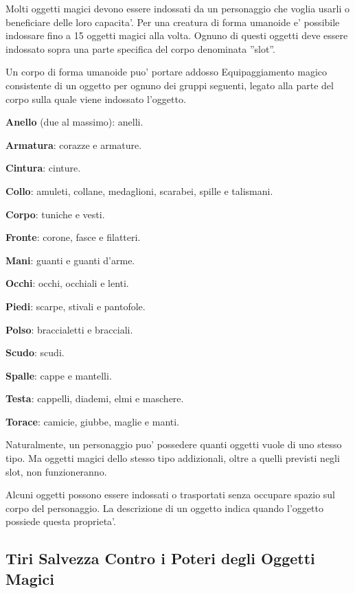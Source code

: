 \documentclass[a4paper,11pt,twoside,openany]{book}
\begin{document}
{		\label{oggetti-magici-sul-corpo}
		
		Molti oggetti magici devono essere indossati da un personaggio che voglia usarli o beneficiare delle loro capacita'. Per una creatura di forma umanoide e' possibile indossare fino a 15 oggetti magici alla volta. Ognuno di questi oggetti deve essere indossato sopra una parte specifica del corpo denominata ''slot''.
		
		Un corpo di forma umanoide puo' portare addosso Equipaggiamento magico consistente di un oggetto per ognuno dei gruppi seguenti, legato alla parte del corpo sulla quale viene indossato l'oggetto.
		
		\textbf{Anello} (due al massimo): anelli.
		
		\textbf{Armatura}: corazze e armature.
		
		\textbf{Cintura}: cinture.
		
		\textbf{Collo}: amuleti, collane, medaglioni, scarabei, spille e talismani.
		
		\textbf{Corpo}: tuniche e vesti.
		
		\textbf{Fronte}: corone, fasce e filatteri.
		
		\textbf{Mani}: guanti e guanti d'arme.
		
		\textbf{Occhi}: occhi, occhiali e lenti.
		
		\textbf{Piedi}: scarpe, stivali e pantofole.
		
		\textbf{Polso}: braccialetti e bracciali.
		
		\textbf{Scudo}: scudi.
		
		\textbf{Spalle}: cappe e mantelli.
		
		\textbf{Testa}: cappelli, diademi, elmi e maschere.
		
		\textbf{Torace}: camicie, giubbe, maglie e manti.
		
		Naturalmente, un personaggio puo' possedere quanti oggetti vuole di uno stesso tipo. Ma oggetti magici dello stesso tipo addizionali, oltre a quelli previsti negli slot, non funzioneranno. 
		
		Alcuni oggetti possono essere indossati o trasportati senza occupare spazio sul corpo del personaggio. La descrizione di un oggetto indica quando l'oggetto possiede questa proprieta'.
		
		
		\subsection{Tiri Salvezza Contro i Poteri degli Oggetti Magici}
		
}
\end{document}
